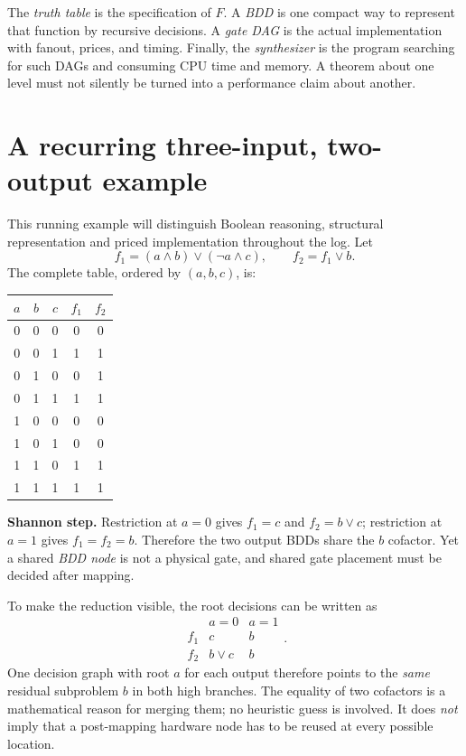 \documentclass[a4paper,10pt]{article}
\theoremstyle{definition}
\theoremstyle{remark}
\newcounter{problem}
\begin{document}
\begin{tcolorbox}[colback=ResearchIvory!75,colframe=ResearchSlate,title=Four levels of objects: keep them separate]
The \emph{truth table} is the specification of $F$. A \emph{BDD} is one compact way to represent that function by recursive decisions. A \emph{gate DAG} is the actual implementation with fanout, prices, and timing. Finally, the \emph{synthesizer} is the program searching for such DAGs and consuming CPU time and memory. A theorem about one level must not silently be turned into a performance claim about another.
\end{tcolorbox}

\section{A recurring three-input, two-output example}
This running example will distinguish Boolean reasoning, structural representation and priced implementation throughout the log. Let
\[
 f_1=(a\land b)\lor(\neg a\land c),\qquad f_2=f_1\lor b.
\]
The complete table, ordered by $(a,b,c)$, is:
\begin{center}\small
\begin{tabular}{ccc|cc}\toprule
$a$&$b$&$c$&$f_1$&$f_2$\\\midrule
0&0&0&0&0\\0&0&1&1&1\\0&1&0&0&1\\0&1&1&1&1\\
1&0&0&0&0\\1&0&1&0&0\\1&1&0&1&1\\1&1&1&1&1\\\bottomrule
\end{tabular}
\end{center}
\textbf{Shannon step.} Restriction at $a=0$ gives $f_1=c$ and $f_2=b\lor c$; restriction at $a=1$ gives $f_1=f_2=b$. Therefore the two output BDDs share the $b$ cofactor. Yet a shared \emph{BDD node} is not a physical gate, and shared gate placement must be decided after mapping.

To make the reduction visible, the root decisions can be written as
\[
\begin{array}{c|cc}
 & a=0 & a=1\\\hline
f_1 & c & b\\
f_2 & b\lor c & b
\end{array}.
\]
One decision graph with root $a$ for each output therefore points to the \emph{same} residual subproblem $b$ in both high branches. The equality of two cofactors is a mathematical reason for merging them; no heuristic guess is involved. It does \emph{not} imply that a post-mapping hardware node has to be reused at every possible location.
\end{document}
